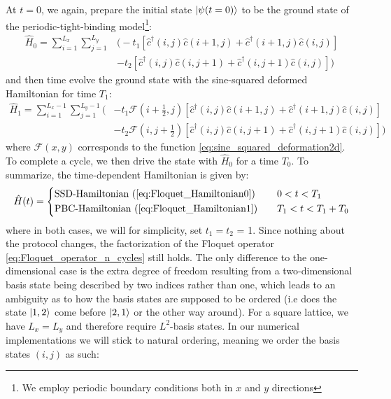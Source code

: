 \documentclass[11pt, a4paper, oneside]{book}
\theoremstyle{definition} %
\begin{document}
 At $t=0$, we again, prepare the initial state $\ket{\psi(t=0)}$ to be the ground state of the periodic-tight-binding model\footnote{We employ periodic boundary conditions both in $x$ and $y$ directions}:
\begin{equation}
\begin{split}
	\hat{H}_0 =  \sum_{i = 1}^{L_x} \sum_{j=1}^{L_y}& \Big( -t_1 \left[ \hat{c}^\dagger(i, j) \hat{c}(i+1, j) + \hat{c}^\dagger(i+1, j)\hat{c}(i, j) \right] \\
	&-t_2 \left[\hat{c}^\dagger(i,j) \hat{c}(i,j+1) + \hat{c}^\dagger(i, j+1)\hat{c}(i,j) \right] \Big)
	\label{eq:Floquet_Hamiltonian0}
\end{split}
\end{equation}  
and then time evolve the ground state with the sine-squared deformed Hamiltonian for time $T_1$:
 \begin{equation}
 \begin{split}
		\hat{H}_\text{1} = \sum_{i=1}^{L_x-1} \sum_{j=1}^{L_y-1}\Big(&-t_1 \mathcal{F}\left(i+\frac{1}{2}, j\right) \left[ \hat{c}^\dagger(i,j)\hat{c}(i+1, j) + \hat{c}^\dagger(i+1,j) \hat{c}(i,j)\right]  \\
& -t_2 \mathcal{F}\left(i, j + \frac{1}{2}\right) \left[\hat{c}^\dagger(i, j) \hat{c}(i, j + 1) + \hat{c}^\dagger(i, j+1) \hat{c}(i,j) \right]\Big)
\label{eq:Floquet_Hamiltonian1}
\end{split}
\end{equation}
where $\mathcal{F}(x,y)$ corresponds to the function \ref{eq:sine_squared_deformation2d}. To complete a cycle, we then drive the state with $\hat{H}_0$ for a time $T_0$. To summarize, the time-dependent Hamiltonian is given by:
	\begin{equation}
	\hat{H}(t) = 
		\begin{dcases}
		\text{SSD-Hamiltonian } (\ref{eq:Floquet_Hamiltonian0}) \quad &0<t< T_1 \\
		\text{PBC-Hamiltonian } (\ref{eq:Floquet_Hamiltonian1}) \quad &T_1 < t < T_1 + T_0
		\end{dcases}
		\label{eq:Floquet_Hamiltonian2d}
	\end{equation}
where in both cases, we will for simplicity, set $t_1 = t_2$ = 1.
Since nothing about the protocol changes, the factorization of the Floquet operator \ref{eq:Floquet_operator_n_cycles} still holds. The only difference to the one-dimensional case is the extra degree of freedom resulting from a two-dimensional basis state being described by two indices rather than one, which leads to an ambiguity as to how the basis states are supposed to be ordered (i.e does the state $\ket{1,2}$ come before $\ket{2,1}$ or the other way around). For a square lattice, we have $L_x = L_y$ and therefore require $L^2$-basis states. In our numerical implementations we will stick to natural ordering, meaning we order the basis states $(i,j)$ as such:
\end{document}
